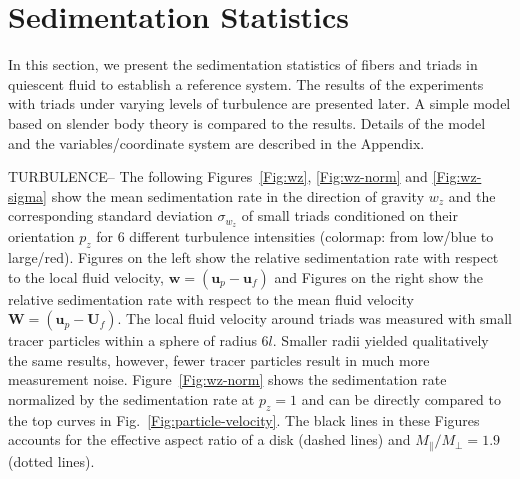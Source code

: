 \documentclass[]{jfm}
\begin{document}
\section{Sedimentation Statistics}
In this section, we present the sedimentation statistics of fibers and triads in quiescent fluid to establish a reference system. The results of the experiments with triads under varying levels of turbulence are presented later.  A simple model based on slender body theory is compared to the results.  Details of the model and the variables/coordinate system are described in the Appendix.

TURBULENCE-- The following Figures~\ref{Fig:wz}, \ref{Fig:wz-norm} and \ref{Fig:wz-sigma} show the mean sedimentation rate in the direction of gravity $w_z$ and the corresponding standard deviation $\sigma_{w_z}$ of small triads conditioned on their orientation $p_z$ for 6 different turbulence intensities (colormap: from low/blue to large/red).  Figures on the left show the relative sedimentation rate with respect to the local fluid velocity, $\mathbf{w}=(\mathbf{u}_p{-}\mathbf{u}_f)$ and Figures on the right show the relative sedimentation rate with respect to the mean fluid velocity $\mathbf{W}=(\mathbf{u}_p{-}\mathbf{U}_f)$.  The local fluid velocity around triads was measured with small tracer particles within a sphere of radius 6$l$.  Smaller radii yielded qualitatively the same results, however, fewer tracer particles result in much more measurement noise.  Figure~\ref{Fig:wz-norm} shows the sedimentation rate normalized by the sedimentation rate at $p_z=1$ and can be directly compared to the top curves in Fig.~\ref{Fig:particle-velocity}.  The black lines in these Figures accounts for the effective aspect ratio of a disk (dashed lines) and $M_\parallel/M_\perp=1.9$ (dotted lines).  
\end{document}
